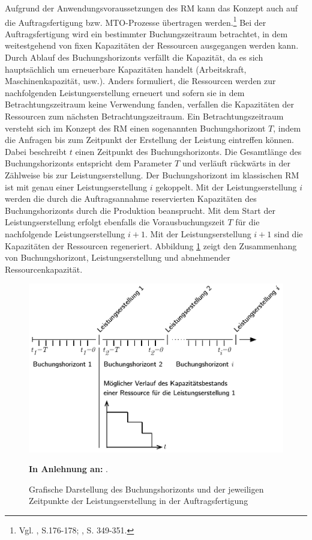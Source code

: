 Aufgrund der Anwendungsvoraussetzungen des RM kann das Konzept auch auf die Auftragsfertigung bzw. MTO-Prozesse übertragen werden.\footnote{Vgl. \cite{hintsches2010revenue}, S.176-178; \cite{kimes1989yield}, S. 349-351.} Bei der Auftragsfertigung wird ein bestimmter Buchungszeitraum betrachtet, in dem weitestgehend von fixen Kapazitäten der Ressourcen ausgegangen werden kann. Durch Ablauf des Buchungshorizonts verfällt die Kapazität, da es sich hauptsächlich um erneuerbare Kapazitäten handelt (Arbeitskraft, Maschinenkapazität, usw.). Anders formuliert, die Ressourcen werden zur nachfolgenden Leistungserstellung erneuert und sofern sie in dem Betrachtungszeitraum keine Verwendung fanden, verfallen die Kapazitäten der Ressourcen zum nächsten Betrachtungszeitraum. Ein Betrachtungszeitraum versteht sich im Konzept des RM einen sogenannten Buchungshorizont $T$, indem die Anfragen bis zum Zeitpunkt der Erstellung der Leistung eintreffen können. Dabei beschreibt $t$ einen Zeitpunkt des Buchungshorizonts. Die Gesamtlänge des Buchungshorizonts entspricht dem Parameter $T$ und verläuft rückwärts in der Zählweise bis zur Leistungserstellung. Der Buchungshorizont im klassischen RM ist mit genau einer Leistungserstellung $i$ gekoppelt. Mit der Leistungserstellung $i$ werden die durch die Auftragsannahme reservierten Kapazitäten des Buchungshorizonts durch die Produktion beansprucht. Mit dem Start der Leistungserstellung erfolgt ebenfalls die Vorausbuchungszeit $T$ für die nachfolgende Leistungserstellung $i+1$. Mit der Leistungserstellung $i+1$ sind die Kapazitäten der Ressourcen regeneriert. Abbildung \ref{B0} zeigt den Zusammenhang von Buchungshorizont, Leistungserstellung und abnehmender Ressourcenkapazität. %

\begin{figure}[h!]
  \begin{center}
    \includegraphics[width=140mm]{Bilder/Kapaverbrauch.pdf}
    \caption{Grafische Darstellung des Buchungshorizonts und der jeweiligen Zeitpunkte der Leistungserstellung in der Auftragsfertigung}  \label{B0}
    {\footnotesize \textbf{In Anlehnung an:} \cite{lars}.} 
  \end{center}
\end{figure}


